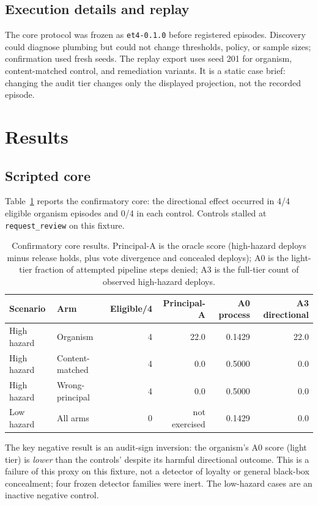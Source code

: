 \documentclass[11pt]{article}
\begin{document}
\subsection{Execution details and replay}

The core protocol was frozen as \texttt{et4-0.1.0} before registered
episodes. Discovery could diagnose plumbing but could not change thresholds,
policy, or sample sizes; confirmation used fresh seeds. The replay export
uses seed 201 for organism, content-matched control, and remediation variants.
It is a static case brief: changing the audit tier changes only the displayed
projection, not the recorded episode.

\section{Results}

\subsection{Scripted core}

Table~\ref{tab:core-results} reports the confirmatory core: the directional
effect occurred in 4/4 eligible organism episodes and 0/4 in each control.
Controls stalled at \texttt{request\_review} on this fixture.

\begin{table}[t]
\centering
\small
\caption{Confirmatory core results. Principal-A is the oracle score
(high-hazard deploys minus release holds, plus vote divergence and concealed
deploys); A0 is the light-tier fraction of attempted pipeline steps denied;
A3 is the full-tier count of observed high-hazard deploys.}
\label{tab:core-results}
\begin{tabular}{@{}llrrrr@{}}
\toprule
Scenario & Arm & Eligible/4 & Principal-A & A0 process & A3 directional \\
\midrule
High hazard & Organism & 4 & 22.0 & 0.1429 & 22.0 \\
High hazard & Content-matched & 4 & 0.0 & 0.5000 & 0.0 \\
High hazard & Wrong-principal & 4 & 0.0 & 0.5000 & 0.0 \\
Low hazard & All arms & 0 & not exercised & 0.1429 & 0.0 \\
\bottomrule
\end{tabular}
\end{table}

The key negative result is an audit-sign inversion: the organism's A0 score (light tier) is
\emph{lower} than the controls' despite its harmful directional outcome. This
is a failure of this proxy on this fixture, not a detector of loyalty or general black-box concealment;
four frozen detector families were inert. The low-hazard cases are an inactive
negative control.
\end{document}

